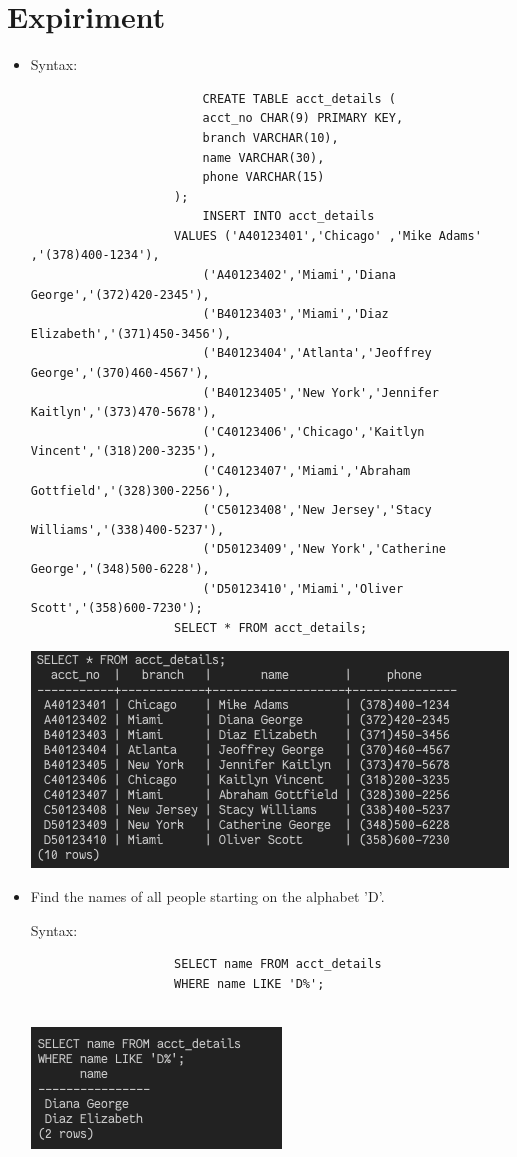 \documentclass[13pt,oneside]{book}
\begin{document}
					\section*{Expiriment}
					\begin{itemize}
					\item 
					Syntax:
					\begin{verbatim}
						CREATE TABLE acct_details (
						acct_no CHAR(9) PRIMARY KEY,
						branch VARCHAR(10),
						name VARCHAR(30),
						phone VARCHAR(15)	
					);
						INSERT INTO acct_details 
					VALUES ('A40123401','Chicago' ,'Mike Adams' ,'(378)400-1234'),
						('A40123402','Miami','Diana George','(372)420-2345'),
						('B40123403','Miami','Diaz Elizabeth','(371)450-3456'),
						('B40123404','Atlanta','Jeoffrey George','(370)460-4567'),
						('B40123405','New York','Jennifer Kaitlyn','(373)470-5678'),
						('C40123406','Chicago','Kaitlyn Vincent','(318)200-3235'),
						('C40123407','Miami','Abraham Gottfield','(328)300-2256'),
						('C50123408','New Jersey','Stacy Williams','(338)400-5237'),
						('D50123409','New York','Catherine George','(348)500-6228'),
						('D50123410','Miami','Oliver Scott','(358)600-7230');
					SELECT * FROM acct_details;
					\end{verbatim}
					\includegraphics[]{img/p6/ss0.png}
					
					\item
					Find the names of all people starting on the alphabet 'D’.
					 
					Syntax:
					\begin{verbatim}
					SELECT name FROM acct_details
					WHERE name LIKE 'D%';
					
					\end{verbatim}
					\includegraphics[]{img/p6/ss1.png}
					

\end{itemize}
\end{document}

